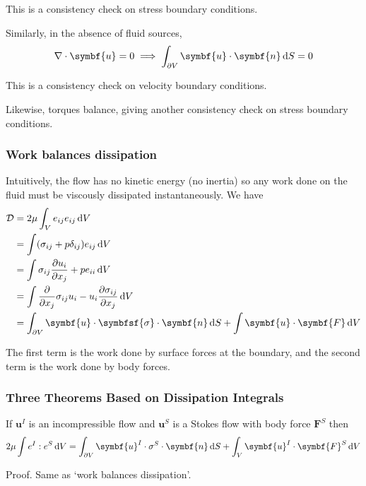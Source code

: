 \documentclass{jknotes}
\begin{document}
This is a consistency check on stress boundary conditions. 

Similarly, in the absence of fluid sources,
\begin{equation}
	\nabla \cdot \symbf{u} = 0 \implies \int_{\partial V} \symbf{u} \cdot \symbf{n} \,
	\diffd S = 0
\end{equation}

This is a consistency check on velocity boundary conditions.

Likewise, torques balance, giving another consistency check on stress boundary
conditions.

\subsubsection{Work balances dissipation}
Intuitively, the flow has no kinetic energy (no inertia)  so any work done on
the fluid must be viscously dissipated instantaneously. We have
\begin{equation}
	\begin{aligned}
		\mathcal{D} &= 2\mu \int_V e_{ij} e_{ij} \, \diffd V \\
				&= \int (\sigma_{ij} + p \delta_{ij}) e_{ij} \, \diffd V \\
	&= \int \sigma_{ij} \frac{\partial u_i}{\partial x_j} + p e_{ii} \, \diffd V \\
	&= \int \frac{\partial}{\partial x_j} \sigma_{ij} u_i - u_i \frac{\partial
	\sigma_{ij}}{\partial x_j} \, \diffd V \\
	&= \int_{\partial V} \symbf{u} \cdot \symbfsf{\sigma} \cdot \symbf{n} \, \diffd S + \int
	\symbf{u} \cdot \symbf{F} \, \diffd V
	\end{aligned}
\end{equation}

The first term is the work done by surface forces at the boundary, and the
second term is the work done by body forces.

\subsubsection{Three Theorems Based on Dissipation Integrals}
\begin{lemma}
	\label{l1}
	If $\symbf{u}^I$ is an incompressible flow and $\symbf{u}^S$ is a Stokes flow
	with body force $\symbf{F}^S$ then 
	\begin{equation}
		2\mu \int e^{I} : e^{S} \, \diffd V = \int_{\partial V} \symbf{u}^I \cdot
		\sigma^S \cdot \symbf{n} \, \diffd S + \int_V \symbf{u}^I \cdot \symbf{F}^S \,
		\diffd V
	\end{equation}
\end{lemma}
Proof. Same as `work balances dissipation'.
\end{document}
